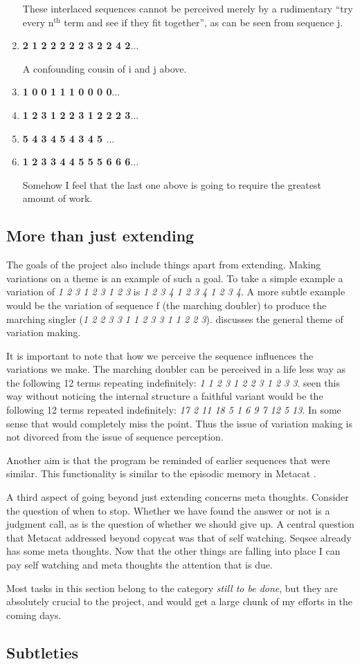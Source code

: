 \begin{enumerate}
These interlaced sequences cannot be perceived merely by a rudimentary ``try every n$^\textrm{th}$ term and see if they fit together'', as can be seen from sequence j.

\item \textbf{ 2 1 2 2 2 2 2 3 2 2 4 2$\ldots$}

A confounding cousin of i and j above.

\item \textbf{ 1 0 0 1 1 1 0 0 0 0$\ldots$}
\item \textbf{ 1 2 3 1 2 2 3 1 2 2 2 3$\ldots$}
\item \textbf{ 5 4 3 4 5 4 3 4 5 $\ldots$}
\item \textbf{ 1 2 3 3 4 4 5 5 5 6 6 6$\ldots$}

Somehow I feel that the last one above is going to require the greatest amount of work.
\end{enumerate}

\subsection{More than just extending}
\label{sec:more}
The goals of the project also include things apart from extending.  Making variations on a theme is an example of such a goal.  To take a simple example a variation of \emph{1 2 3 1 2 3 1 2 3} is \emph{1 2 3 4 1 2 3 4 1 2 3 4}.  A more subtle example would be the variation of  sequence f (the marching doubler) to produce the marching singler (\emph{1 2 2 3 3 1 1 2 3 3 1 1 2 2 3}).  discusses the general theme of variation making.

It is important to note that how we perceive the sequence influences the variations we make.  The marching doubler can be perceived in a life less way as the following 12 terms repeating indefinitely: \emph{1 1 2 3 1 2 2 3 1 2 3 3}.  seen this way without noticing the internal structure a faithful variant would be the following 12 terms repeated indefinitely: \emph{17 2 11 18 5 1 6 9 7 12 5 13}. In some sense that would completely miss the point. Thus the issue of variation making is not divorced from the issue of sequence perception.

Another aim is that the program be reminded of earlier sequences that were similar.  This functionality is similar to the episodic memory in Metacat \cite{Marshall}.

A third aspect of going beyond just extending concerns meta thoughts.  Consider the question of when to stop.  Whether we have found the answer or not is a judgment call, as is the question of whether we should give up.  A central question that Metacat addressed beyond copycat was that of self watching.  Seqsee already has some meta thoughts. Now that the other things are falling into place I can pay self watching and meta thoughts the attention that is due. 

Most tasks in this section belong to the category \emph{still to be done}, but they are absolutely crucial to the project, and would get a large chunk of my efforts in the coming days.

\subsection{Subtleties}
\label{sec:subtleties}

%
%

% 
